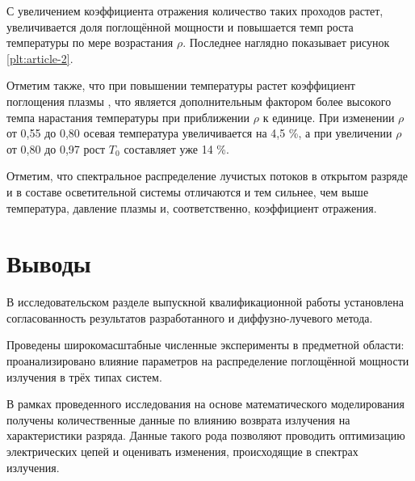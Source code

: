 \vspace{-10mm}

С увеличением коэффициента отражения количество таких проходов растет, увеличивается доля поглощённой мощности и повышается темп роста температуры по мере возрастания $\rho$.
Последнее наглядно показывает рисунок \ref{plt:article-2}.

Отметим также, что при повышении температуры растет коэффициент поглощения плазмы \cite{article-8-gradov, article-9-gradov}, что является дополнительным фактором более высокого темпа нарастания температуры при приближении $\rho$ к единице.
При изменении $\rho$ от 0,55 до 0,80 осевая температура увеличивается на 4,5 \%, а при увеличении $\rho$ от 0,80 до 0,97 рост $T_0$ составляет уже 14 \%.

Отметим, что спектральное распределение лучистых потоков в открытом разряде и в составе осветительной системы отличаются и тем сильнее, чем выше температура, давление плазмы и, соответственно, коэффициент отражения.

\section*{Выводы}

В исследовательском разделе выпускной квалификационной работы установлена согласованность результатов разработанного и диффузно-лучевого метода.

Проведены широкомасштабные численные эксперименты в предметной области: проанализировано влияние параметров на распределение поглощённой мощности излучения в трёх типах систем.

В рамках проведенного исследования на основе математического моделирования получены количественные данные по влиянию возврата излучения на характеристики разряда.
Данные такого рода позволяют проводить оптимизацию электрических цепей и оценивать изменения, происходящие в спектрах излучения.

